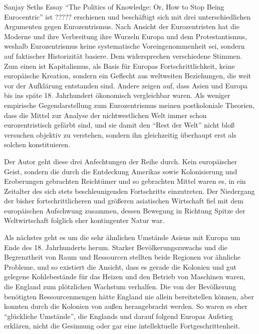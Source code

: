 \documentclass[a4paper, 12pt]{article}
\begin{document}
\begin{onehalfspace} 





\noindent 
Sanjay Seths Essay "`The Politics of Knowledge: Or, How to Stop Being Eurocentric"' ist ????? erschienen und beschäftigt sich mit drei unterschiedlichen Argumenten gegen Eurozentrismus. Nach Ansicht der Eurozentristen hat die Moderne und ihre Verbreitung ihre Wurzeln Europa und dem Protestantismus, weshalb Eurozentrismus keine systematische Voreingenommenheit sei, sondern auf faktischer Historizität basiere. Dem widersprechen verschiedene Stimmen. Zum einen ist Kapitalismus, als Basis für Europas Fortschrittlichkeit, keine europäische Kreation, sondern ein Geflecht aus weltweiten Beziehungen, die weit vor der Aufklärung entstanden sind. Andere zeigen auf, dass Asien und Europa bis ins späte 18. Jahrhundert ökonomisch vergleichbar waren. Als weniger empirische Gegendarstellung zum Eurozentrismus meinen postkoloniale Theorien, dass die Mittel zur Analyse der nichtwestlichen Welt immer schon eurozentristisch gefärbt sind, und sie damit den “Rest der Welt” nicht bloß versuchen objektiv zu verstehen, sondern ihn gleichzeitig überhaupt erst als solchen konstituieren.

Der Autor geht diese drei Anfechtungen der Reihe durch. 
Kein europäischer Geist, sondern die durch die Entdeckung Amerikas sowie Kolonisierung und Eroberungen gebrachten Reichtümer und so gebrachten Mittel waren es, in ein Zeitalter des sich stets beschleunigenden Fortschritts einzutreten. Der Niedergang der bisher fortschrittlicheren und größeren asiatischen Wirtschaft fiel mit dem europäischen Aufschwung zusammen, dessen Bewegung in Richtung Spitze der Weltwirtschaft folglich eher kontingenter Natur war.

Als nächstes geht es um die sehr ähnlichen Umstände Asiens mit Europa um Ende des 18. Jahrhunderts herum. Starker Bevölkerungszuwachs und die Begrenztheit von Raum und Ressourcen stellten beide Regionen vor ähnliche Probleme, und so existiert die Ansicht, dass es gerade die Kolonien und gut gelegene Kohlebestände für das Heizen und den Betrieb von Maschinen waren, die England zum plötzlichen Wachstum verhalfen. Die von der Bevölkerung benötigten Ressourcenmengen hätte England nie allein bereitstellen können, aber konnten durch die Kolonien von außen herangebracht werden. So waren es eher “glückliche Umstände”, die Englands und darauf folgend Europas Aufstieg erklären, nicht die Gesinnung oder gar eine  intellektuelle Fortgeschrittenheit. 


\end{onehalfspace}
\end{document}
